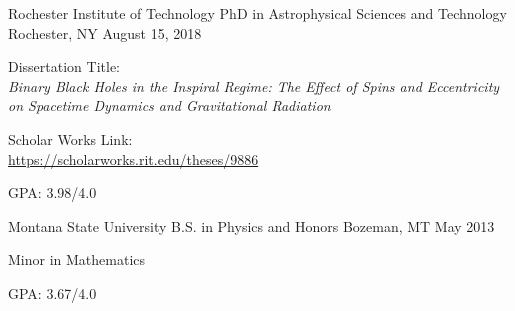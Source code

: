 \begin{cventries}
 \cventry
    {Rochester Institute of Technology}
    {PhD in Astrophysical Sciences and Technology}
    {Rochester, NY}
    {August 15, 2018}
    {
      \begin{cvitems}
       \item {Dissertation Title: \\
       \textit{Binary Black Holes in the Inspiral Regime:
       The Effect of Spins and Eccentricity on Spacetime Dynamics and Gravitational Radiation}}
       \item {Scholar Works Link: \\
       \url{https://scholarworks.rit.edu/theses/9886}}
       \item {GPA: 3.98/4.0}
      \end{cvitems}
   }

  \cventry
    {Montana State University}
    {B.S. in Physics and Honors}
    {Bozeman, MT}
    {May 2013}
    {
      \begin{cvitems}
        \item {Minor in Mathematics}
        \item {GPA: 3.67/4.0}
      \end{cvitems}
   }

\end{cventries}
